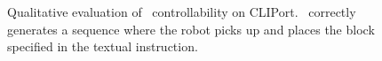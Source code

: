  

\begin{figure}[t]
	\vspace{-0.4cm}
	\caption{
		Qualitative evaluation of \Method~controllability on CLIPort.
		\Method~correctly generates a sequence where the robot picks up and places the block specified in the textual instruction.
	}
	\label{fig: sup cliport control 00}
\end{figure}